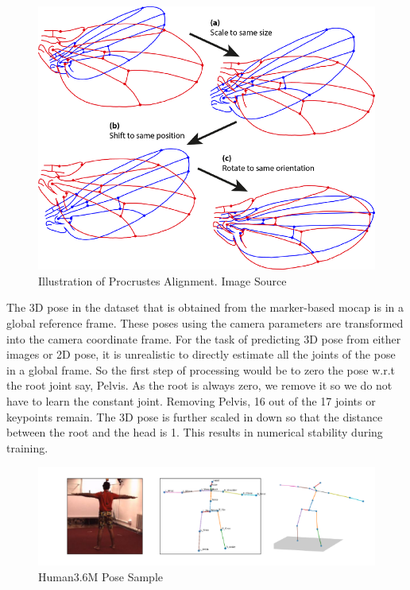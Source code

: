 \begin{figure}[!h]
    \centering
    \includegraphics[scale=0.8]{figures/Procrustes_superimposition.png}
    \caption{Illustration of Procrustes Alignment. Image Source \cite{Procrustes}}
    \label{fig:procrustes}
\end{figure}


The 3D pose in the dataset that is obtained from the marker-based \ac{mocap} is in a global reference frame. These poses using the camera parameters are transformed into the camera coordinate frame. For the task of predicting 3D pose from either images or 2D pose, it is unrealistic to directly estimate all the joints of the pose in a global frame. So the first step of processing would be to zero the pose w.r.t the root joint say, Pelvis. As the root is always zero, we remove it so we do not have to learn the constant joint. Removing Pelvis, 16 out of the 17 joints or keypoints remain. The 3D pose is further scaled in down so that the distance between the root and the head is 1. This results in numerical stability during training.

\begin{figure}[h]
    \centering
    \includegraphics[width=\textwidth]{figures/h36poses.png}
    \caption{Human3.6M Pose Sample}
    \label{fig:h36_poses}
\end{figure}


